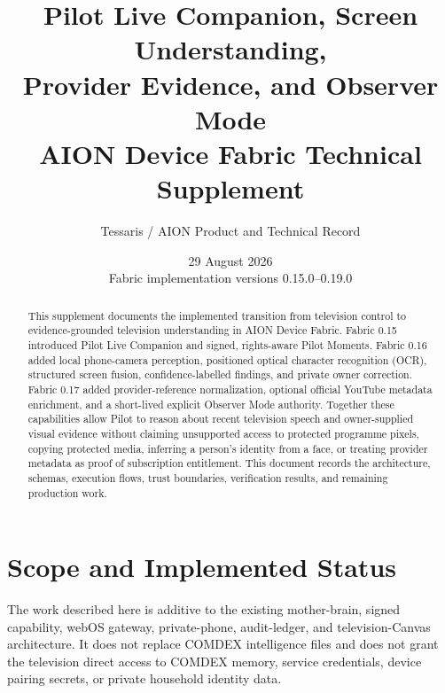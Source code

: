 \documentclass[11pt,a4paper]{article}
\title{\textbf{Pilot Live Companion, Screen Understanding,\\Provider Evidence, and Observer Mode}\\[4pt]
\large AION Device Fabric Technical Supplement}
\author{Tessaris / AION Product and Technical Record}
\date{29 August 2026\\Fabric implementation versions 0.15.0--0.19.0}
\begin{document}
\maketitle

\begin{abstract}
This supplement documents the implemented transition from television control
to evidence-grounded television understanding in AION Device Fabric.  Fabric
0.15 introduced Pilot Live Companion and signed, rights-aware Pilot Moments.
Fabric 0.16 added local phone-camera perception, positioned optical character
recognition (OCR), structured screen fusion, confidence-labelled findings, and
private owner correction.  Fabric 0.17 added provider-reference normalization,
optional official YouTube metadata enrichment, and a short-lived explicit
Observer Mode authority.  Together these capabilities allow Pilot to reason
about recent television speech and owner-supplied visual evidence without
claiming unsupported access to protected programme pixels, copying protected
media, inferring a person's identity from a face, or treating provider metadata
as proof of subscription entitlement.  This document records the architecture,
schemas, execution flows, trust boundaries, verification results, and remaining
production work.
\end{abstract}

\section{Scope and Implemented Status}

The work described here is additive to the existing mother-brain, signed
capability, webOS gateway, private-phone, audit-ledger, and television-Canvas
architecture.  It does not replace COMDEX intelligence files and does not grant
the television direct access to COMDEX memory, service credentials, device
pairing secrets, or private household identity data.
\end{document}
